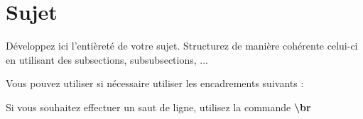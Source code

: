 \section{Sujet}
Développez ici l'entièreté de votre sujet.
Structurez de manière cohérente celui-ci en utilisant des subsections, subsubsections, ...

\br

Vous pouvez utiliser si nécessaire utiliser les encadrements suivants :




\br

Si vous souhaitez effectuer un saut de ligne, utilisez la commande \textbf{\textbackslash br}